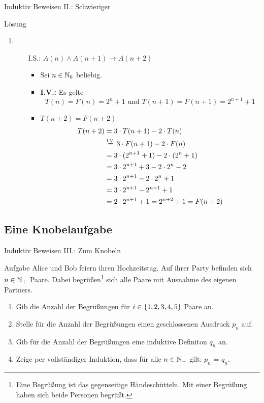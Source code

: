 \begin{frame}{Induktiv Beweisen II.: Schwieriger}
	\begin{block}{Lösung}
	\begin{enumerate}
		\setcounter{enumi}{\value{kevin}}
		\item
		\begin{itemize}
				\item[I.S.:] $A(n) \wedge A(n+1) \rightarrow A(n+2)$ %
					\begin{itemize}
						\item Sei $n \in \mathbb{N}_{0}$ beliebig.
						\item \textbf{I.V.:} Es gelte
				 					\[T(n)=F(n)=2^n+1 \text{ und } T(n+1)=F(n+1)=2^{n+1}+1\]
				 		\item \zz $T(n+2) = F(n+2)$
				 		\begin{align*}
							T(n+2) &= 3 \cdot T(n+1) - 2 \cdot T(n) \\
								   &\eqtext{I.V.} 3 \cdot F(n+1) - 2 \cdot F(n) \\
								   &= 3 \cdot (2^{n+1}+1) - 2 \cdot (2^n+1) \\
								   &= 3 \cdot 2^{n+1} + 3 - 2 \cdot 2^n - 2 \\
								   &= 3 \cdot 2^{n+1} - 2 \cdot 2^n + 1 \\
								   &= 3 \cdot 2^{n+1} - 2^{n+1} +1 \\
								   &= 2 \cdot 2^{n+1} + 1 = 2^{n+2} + 1 = F(n+2)
						\end{align*}
					\end{itemize}				
			\end{itemize}
		\end{enumerate}
	\end{block}
\end{frame}
\subsection{Eine Knobelaufgabe}
\begin{frame}{Induktiv Beweisen III.: Zum Knobeln}
	\begin{exampleblock}{Aufgabe}
		Alice und Bob feiern ihren Hochzeitstag. Auf ihrer Party befinden sich $n \in \mathbb{N}_+$ Paare. Dabei begrüßen\footnote{Eine Begrüßung ist das gegenseitige Händeschütteln. Mit einer Begrüßung haben sich beide Personen begrüßt.} sich alle Paare mit Ausnahme des eigenen Partners.\\
		\begin{enumerate}
			\item Gib die Anzahl der Begrüßungen für $i \in \left\{ 1,2,3,4,5 \right\}$ Paare an.
			\item Stelle für die Anzahl der Begrüßungen einen geschlossenen Ausdruck $p_n$ auf.
			\item Gib für die Anzahl der Begrüßungen eine induktive Definiton $q_n$ an.
			\item Zeige per vollständiger Induktion, dass für alle $n \in \mathbb{N}_+$ gilt: $p_n$ = $q_n$.
		\end{enumerate}
	\end{exampleblock}
\end{frame}


